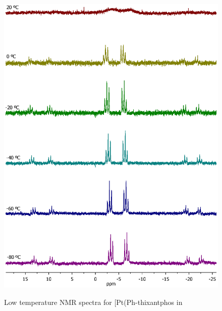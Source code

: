 \begin{figure}[htbp]
\begin{center}
\vspace{0.5cm}
\includegraphics[scale = 0.9, trim = 2cm 1.5cm 1.5cm 4cm, clip]{../NMR/1031-Pt(SPh)2-2.eps}
\caption[Low temperature \phosphorus{} NMR spectra for [Pt(Ph-thixantphos\ce{)2}{]}]{Low temperature \phosphorus{} NMR spectra for [Pt(Ph-thixantphos\ce{)2]} in }
\vspace{0.2cm}
\label{BisSPhPt:PNMR}
\end{center}
\end{figure}
\vspace{0.2cm}

